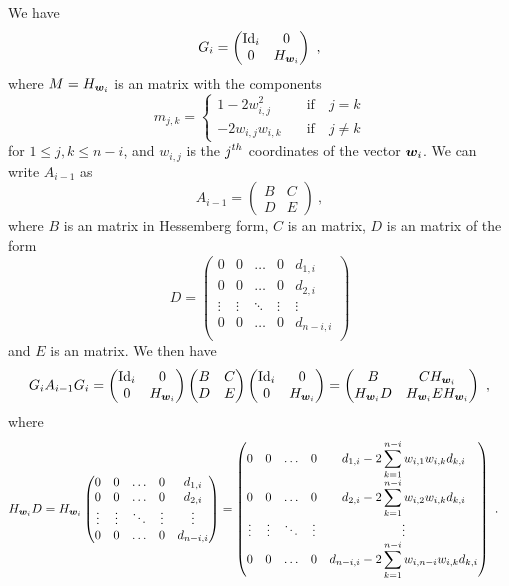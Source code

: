 We have
\[
G_i =
\begin{pmatrix}
\operatorname{Id}_{i} & 0 \\
0 & H_{\bm{w}_i}
\end{pmatrix}
\  ,
\]
where $M=H_{\bm{w}_i}$ is an  matrix with the components
\[
m_{j,k} =
\begin{cases}
1-2w_{i,j}^2 & \quad \text{if} \quad j=k \\
- 2 w_{i,j}w_{i,k} & \quad \text{if} \quad j\neq k
\end{cases}
\]
for $1\leq j,k\leq n-i$, and $w_{i,j}$ is the $\displaystyle j^{th}$
coordinates of the vector $\bm{w}_i$.  We can write $A_{i-1}$ as
\[
A_{i-1} = 
\begin{pmatrix}
B & C \\
D & E
\end{pmatrix} \ ,
\]
where $B$ is an  matrix in Hessemberg form, $C$ is an
 matrix, $D$ is an  matrix of the form
\[
D =
\begin{pmatrix}
0 & 0 & \ldots & 0 & d_{1,i} \\
0 & 0 & \ldots & 0 & d_{2,i} \\
\vdots & \vdots & \ddots & \vdots & \vdots \\
0 & 0 & \ldots & 0 & d_{n-i,i} \\
\end{pmatrix}
\]
and $E$ is an  matrix.  We then have
\[
G_i A_{i-1} G_i =
\begin{pmatrix}
\operatorname{Id}_i & 0 \\
0 & H_{\bm{w}_i}
\end{pmatrix}
\begin{pmatrix}
B & C \\
D & E
\end{pmatrix}
\begin{pmatrix}
\operatorname{Id}_i & 0 \\
0 & H_{\bm{w}_i}
\end{pmatrix}
=
\begin{pmatrix}
B & C H_{\bm{w}_i} \\
H_{\bm{w}_i} D & H_{\bm{w}_i} E H_{\bm{w}_i}
\end{pmatrix} \ ,
\]
where
\begin{align*}
H_{\bm{w}_i} D &=
H_{\bm{w}_i}
\begin{pmatrix}
0 & 0 & \ldots & 0 & d_{1,i} \\
0 & 0 & \ldots & 0 & d_{2,i} \\
\vdots & \vdots & \ddots & \vdots & \vdots \\
0 & 0 & \ldots & 0 & d_{n-i,i}
\end{pmatrix}
=
\begin{pmatrix}
0 & 0 & \ldots & 0 & \displaystyle
d_{1,i} - 2 \sum_{k=1}^{n-i} w_{i,1}w_{i,k}d_{k,i} \\
0 & 0 & \ldots & 0 & \displaystyle
d_{2,i} - 2 \sum_{k=1}^{n-i} w_{i,2}w_{i,k}d_{k,i} \\
\vdots & \vdots & \ddots & \vdots & \vdots \\
0 & 0 & \ldots & 0 & \displaystyle
d_{n-i,i} - 2 \sum_{k=1}^{n-i} w_{i,n-i}w_{i,k}d_{k,i}
\end{pmatrix} \ .
\end{align*}
